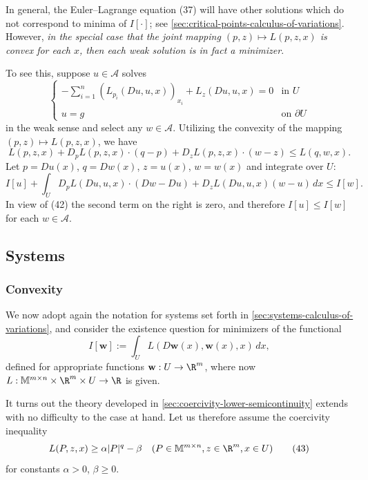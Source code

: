 \begin{remark}
\label{rem:weak-solution-minimizer-joint-convexity}
In general, the Euler--Lagrange equation (37) will have other solutions which do not correspond to minima of $I[\cdot]$; see \cref{sec:critical-points-calculus-of-variations}. However, \textit{in the special case that the joint mapping $(p, z) \mapsto L(p, z, x)$ is convex for each $x$, then each weak solution is in fact a minimizer}.

To see this, suppose $u \in \mathcal{A}$ solves
\[
\begin{cases}
-\sum_{i=1}^n (L_{p_i}(Du, u, x))_{x_i} + L_z(Du, u, x) = 0 & \text{in } U \\
u = g & \text{on } \partial U
\end{cases}
\tag{42}
\]
in the weak sense and select any $w \in \mathcal{A}$. Utilizing the convexity of the mapping $(p, z) \mapsto L(p, z, x)$, we have
\[
L(p, z, x) + D_p L(p, z, x) \cdot (q - p) + D_z L(p, z, x) \cdot (w - z) \leq L(q, w, x).
\]
Let $p = Du(x)$, $q = Dw(x)$, $z = u(x)$, $w = w(x)$ and integrate over $U$:
\[
I[u] + \int_U D_p L(Du, u, x) \cdot (Dw - Du) + D_z L(Du, u, x)(w - u) \, dx \leq I[w].
\]
In view of (42) the second term on the right is zero, and therefore $I[u] \leq I[w]$ for each $w \in \mathcal{A}$.
\end{remark}

\subsection{Systems}
\label{sec:systems-existence-minimizers}

\subsubsection{Convexity}

We now adopt again the notation for systems set forth in \cref{sec:systems-calculus-of-variations}, and consider the existence question for minimizers of the functional
\[
I[\mathbf{w}] := \int_U L(D\mathbf{w}(x), \mathbf{w}(x), x) \, dx,
\]
defined for appropriate functions $\mathbf{w} : U \to \R^m$, where now $L : \mathbb{M}^{m \times n} \times \R^m \times U \to \R$ is given.

It turns out the theory developed in \cref{sec:coercivity-lower-semicontinuity} extends with no difficulty to the case at hand. Let us therefore assume the coercivity inequality
\[
L(P, z, x) \geq \alpha|P|^q - \beta \quad (P \in \mathbb{M}^{m \times n}, z \in \R^m, x \in U)
\tag{43}
\]
for constants $\alpha > 0$, $\beta \geq 0$.

